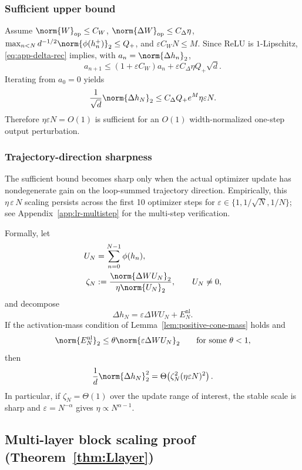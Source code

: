 \subsubsection{Sufficient upper bound}

Assume $\norm{W}_{\mathrm{op}}\le C_W$, $\norm{\Delta W}_{\mathrm{op}}\le C_\Delta\eta$, $\max_{n<N}d^{-1/2}\norm{\phi(h_n^+)}_2\le Q_+$, and $\varepsilon C_WN\le M$. Since ReLU is $1$-Lipschitz, \eqref{eq:app-delta-rec} implies, with $a_n=\norm{\Delta h_n}_2$,
\[
  a_{n+1}
  \le
  (1+\varepsilon C_W)a_n
  +
  \varepsilon C_\Delta\eta Q_+\sqrt d.
\]
Iterating from $a_0=0$ yields
\[
  \frac{1}{\sqrt d}\norm{\Delta h_N}_2
  \le
  C_\Delta Q_+e^M\eta\varepsilon N.
\]
Therefore $\eta\varepsilon N=O(1)$ is sufficient for an $O(1)$ width-normalized one-step output perturbation.

\subsubsection{Trajectory-direction sharpness}

The sufficient bound becomes sharp only when the actual optimizer update has nondegenerate gain on the loop-summed trajectory direction.
Empirically, this $\eta\,\varepsilon\,N$ scaling persists across the first 10 optimizer steps for $\varepsilon\in\{1,1/\!\sqrt N,1/N\}$; see Appendix~\ref{app:lr-multistep} for the multi-step verification.

\noindent
Formally, let
\[
  \begin{aligned}
  U_N&=\sum_{n=0}^{N-1}\phi(h_n),\\
  \zeta_N
  &:=
  \frac{\norm{\Delta WU_N}_2}{\eta\norm{U_N}_2},
  \qquad U_N\ne0,
  \end{aligned}
\]
and decompose
\[
  \Delta h_N
  =
  \varepsilon\Delta WU_N+E_N^{\mathrm{nl}}.
\]
If the activation-mass condition of Lemma~\ref{lem:positive-cone-mass} holds and
\[
  \norm{E_N^{\mathrm{nl}}}_2\le\theta\norm{\varepsilon\Delta WU_N}_2
  \qquad\text{for some }\theta<1,
\]
then
\[
  \frac{1}{d}\norm{\Delta h_N}_2^2
  =
  \Theta\!\left(\zeta_N^2(\eta\varepsilon N)^2\right).
\]
In particular, if $\zeta_N=\Theta(1)$ over the update range of interest, the stable scale is sharp and $\varepsilon=N^{-\alpha}$ gives $\eta\propto N^{\alpha-1}$.

\subsection{Multi-layer block scaling proof (Theorem~\ref{thm:Llayer})}
\label{app:Llayer}

